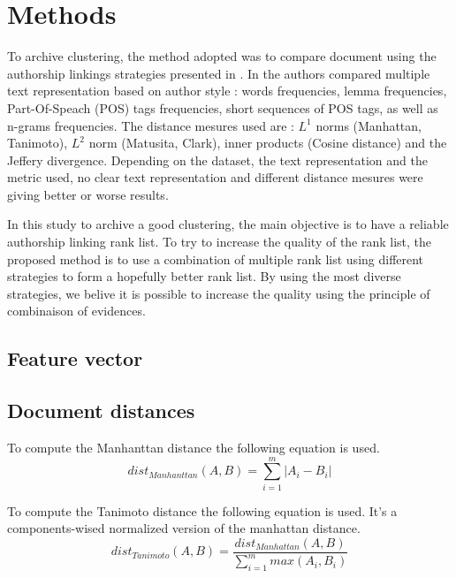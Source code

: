 \section{Methods}

To archive clustering, the method adopted was to compare document using the authorship linkings strategies presented in \cite{kocher_verification}.
In \cite{kocher_verification} the authors compared multiple text representation based on author style : words frequencies, lemma frequencies, Part-Of-Speach (POS) tags frequencies, short sequences of POS tags, as well as n-grams frequencies.
The distance mesures used are : $L^1$ norms (Manhattan, Tanimoto), $L^2$ norm (Matusita, Clark), inner products (Cosine distance) and the Jeffery divergence.
Depending on the dataset, the text representation and the metric used, no clear text representation and different distance mesures were giving better or worse results.

In this study to archive a good clustering, the main objective is to have a reliable authorship linking rank list.
To try to increase the quality of the rank list, the proposed method is to use a combination of multiple rank list using different strategies to form a hopefully better rank list.
By using the most diverse strategies, we belive it is possible to increase the quality using the principle of combinaison of evidences.

\subsection{Feature vector}



\subsection{Document distances}

\begin{definition}
  To compute the Manhanttan distance the following equation is used.
  \begin{equation}
    dist_{Manhanttan}(A, B) = \sum_{i=1}^{m} |A_i - B_i|
  \end{equation}
\end{definition}

\begin{definition}
  To compute the Tanimoto distance the following equation is used. It's a components-wised normalized version of the manhattan distance.
  \begin{equation}
    dist_{Tanimoto}(A, B) = \frac{dist_{Manhattan}(A, B)}{\sum_{i=1}^{m} max(A_i, B_i)}
  \end{equation}
\end{definition}

